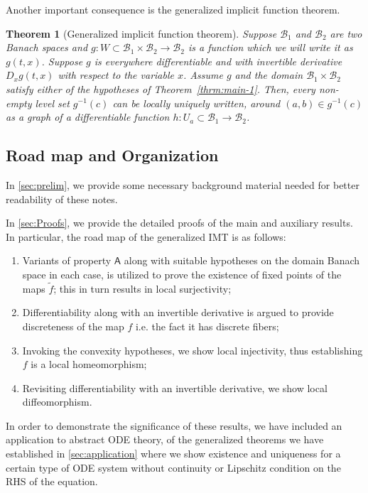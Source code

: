 \documentclass[a4, 12pt,leqno]{amsart}
\theoremstyle{plain}
\newtheorem{theorem}{Theorem}
\theoremstyle{definition}
\theoremstyle{remark}
\numberwithin{equation}{section}
\newcommand{\B}{\mathcal{B}}
\begin{document}
Another important consequence is the generalized implicit function theorem. 

\begin{theorem}[Generalized implicit function theorem]\label{thrm:main-2}
	Suppose $\B_1$ and $\B_2$ are two Banach spaces and $g:W \subset \B_1 \times \B_2 \to \B_2$ is a function which we will write it as $g(t,x)$. Suppose $g$ is everywhere differentiable and with invertible derivative $D_x g(t,x)$ with respect to the variable $x$. Assume $g$ and the domain $\B_1\times \B_2$ satisfy either of the hypotheses of Theorem~\ref{thrm:main-1}. Then, every non-empty level set $g^{-1}(c)$ can be locally uniquely written, around $(a,b) \in g^{-1}(c)$ as a graph of a differentiable function $h: U_a \subset \B_1 \to \B_2$. 
\end{theorem}


\subsection{Road map and Organization}
In \textsection\thinspace\ref{sec:prelim}, we provide some necessary background material needed for better readability of these notes. 

In \textsection\thinspace\ref{sec:Proofs}, we provide the detailed proofs of the main and auxiliary results. In particular, the road map of the generalized IMT is as follows:

\begin{enumerate}
	\item Variants of property $\textsf{A}$ along with suitable hypotheses on the domain Banach space in each case, is utilized to prove the existence of fixed points of the maps $\tilde{f}$; this in turn results in local surjectivity;
	\item Differentiability along with an invertible derivative is argued to provide discreteness of the map $f$ i.e. the fact it has discrete fibers;
	\item Invoking the convexity hypotheses, we show local injectivity, thus establishing $f$ is a local homeomorphism;
	\item Revisiting differentiability with an invertible derivative, we show local diffeomorphism. 
\end{enumerate}  

\par In order to demonstrate the significance of these results, we have included an application to abstract ODE theory, of the generalized theorems we have established in \textsection\thinspace\ref{sec:application} where we show existence and uniqueness for a certain type of ODE system without continuity or Lipschitz condition on the RHS of the equation. 
\end{document}
